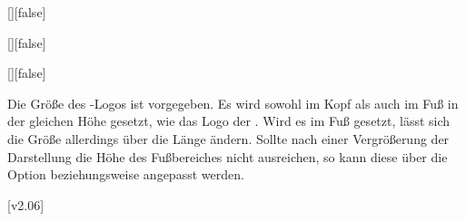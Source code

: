 \begin{Declaration*}{}
\begin{Declaration*}{}
\begin{Declaration*}{}
\begin{Declaration}{[\PSet]}[false]
\begin{Declaration}[v2.02]{[\PSet]}[false]
\begin{Declaration}{[\PSet]}[false]
\begin{values}
\end{values}
%
Die Größe des \DDC-Logos ist vorgegeben. Es wird sowohl im Kopf als auch im Fuß 
in der gleichen Höhe gesetzt, wie das Logo der \TnUD. Wird es im Fuß gesetzt, 
lässt sich die Größe allerdings über die Länge  ändern. 
Sollte nach einer Vergrößerung der Darstellung die Höhe des Fußbereiches nicht 
ausreichen, so kann diese über die Option  beziehungsweise 
 angepasst werden.
\end{Declaration}
\end{Declaration}
\end{Declaration}

[v2.06]


\end{Declaration*}
\end{Declaration*}
\end{Declaration*}
